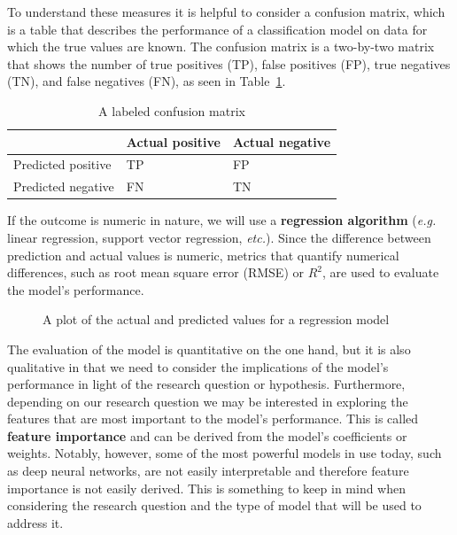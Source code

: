 \documentclass[
  letterpaper,
  DIV=11,
  numbers=noendperiod]{scrreprt}
\theoremstyle{definition}
\theoremstyle{remark}
\begin{document}
To understand these measures it is helpful to consider a confusion
matrix, which is a table that describes the performance of a
classification model on data for which the true values are known. The
confusion matrix is a two-by-two matrix that shows the number of true
positives (TP), false positives (FP), true negatives (TN), and false
negatives (FN), as seen in Table~\ref{tbl-pda-confusion-matrix-metrics}.

\begin{longtable}[t]{lll}

\caption{\label{tbl-pda-confusion-matrix-metrics}A labeled confusion
matrix}

\tabularnewline

\toprule
 & Actual positive & Actual negative\\
\midrule
Predicted positive & TP & FP\\
Predicted negative & FN & TN\\
\bottomrule

\end{longtable}

If the outcome is numeric in nature, we will use a \textbf{regression
algorithm} (\emph{e.g.} linear regression, support vector regression,
\emph{etc.}). Since the difference between prediction and actual values
is numeric, metrics that quantify numerical differences, such as root
mean square error (RMSE) or \(R^2\), are used to evaluate the model's
performance.

\begin{figure}[H]


\caption{\label{fig-pda-regression-metrics}A plot of the actual and
predicted values for a regression model}

\end{figure}%

The evaluation of the model is quantitative on the one hand, but it is
also qualitative in that we need to consider the implications of the
model's performance in light of the research question or hypothesis.
Furthermore, depending on our research question we may be interested in
exploring the features that are most important to the model's
performance. This is called \textbf{feature importance} and can be
derived from the model's coefficients or weights. Notably, however, some
of the most powerful models in use today, such as deep neural networks,
are not easily interpretable and therefore feature importance is not
easily derived. This is something to keep in mind when considering the
research question and the type of model that will be used to address it.
\end{document}
